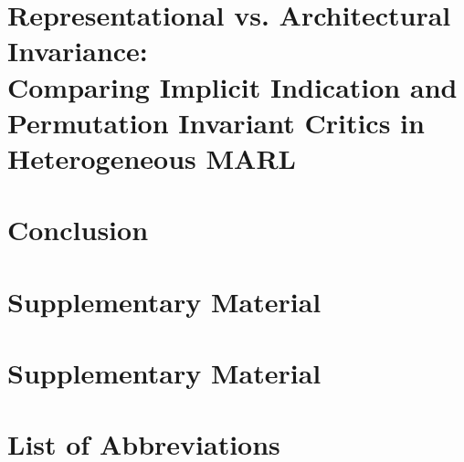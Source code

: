 \documentclass[style=nature,dvipsnames]{afitthesis}
\begin{document}
\chapter[Representational vs. Architectural Invariance]{
    Representational vs. Architectural Invariance: \\ 
    Comparing Implicit Indication and Permutation Invariant Critics in Heterogeneous MARL
}%
\label{ch:contribution_3}


\chapter{Conclusion}
\label{ch:conclusion}



\appendix %

\chapter{\texorpdfstring{}{Contribution 1} Supplementary Material}


\chapter{\texorpdfstring{}{Contribution 2} Supplementary Material}


\chapter{List of Abbreviations}
\printabbreviations[style=sml-grp-skip-gloss]


\printbibliography                          %




\sfTwoNineEight %
\end{document}
